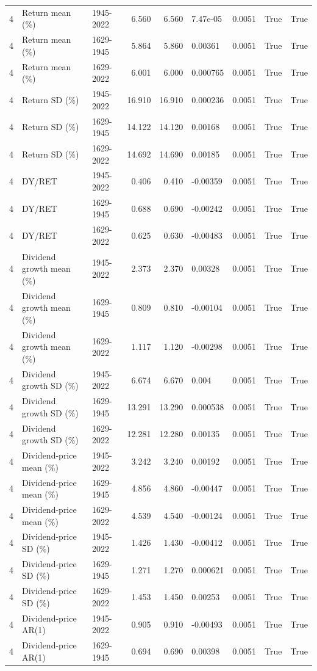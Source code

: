 \documentclass[10pt]{article}
\begin{document}
\begin{landscape}
\begin{longtable}{rllrrllrr}
4 & Return mean (\%) & 1945-2022 & 6.560 & 6.560 & 7.47e-05 & 0.0051 & True & True \\
4 & Return mean (\%) & 1629-1945 & 5.864 & 5.860 & 0.00361 & 0.0051 & True & True \\
4 & Return mean (\%) & 1629-2022 & 6.001 & 6.000 & 0.000765 & 0.0051 & True & True \\
4 & Return SD (\%) & 1945-2022 & 16.910 & 16.910 & 0.000236 & 0.0051 & True & True \\
4 & Return SD (\%) & 1629-1945 & 14.122 & 14.120 & 0.00168 & 0.0051 & True & True \\
4 & Return SD (\%) & 1629-2022 & 14.692 & 14.690 & 0.00185 & 0.0051 & True & True \\
4 & DY/RET & 1945-2022 & 0.406 & 0.410 & -0.00359 & 0.0051 & True & True \\
4 & DY/RET & 1629-1945 & 0.688 & 0.690 & -0.00242 & 0.0051 & True & True \\
4 & DY/RET & 1629-2022 & 0.625 & 0.630 & -0.00483 & 0.0051 & True & True \\
4 & Dividend growth mean (\%) & 1945-2022 & 2.373 & 2.370 & 0.00328 & 0.0051 & True & True \\
4 & Dividend growth mean (\%) & 1629-1945 & 0.809 & 0.810 & -0.00104 & 0.0051 & True & True \\
4 & Dividend growth mean (\%) & 1629-2022 & 1.117 & 1.120 & -0.00298 & 0.0051 & True & True \\
4 & Dividend growth SD (\%) & 1945-2022 & 6.674 & 6.670 & 0.004 & 0.0051 & True & True \\
4 & Dividend growth SD (\%) & 1629-1945 & 13.291 & 13.290 & 0.000538 & 0.0051 & True & True \\
4 & Dividend growth SD (\%) & 1629-2022 & 12.281 & 12.280 & 0.00135 & 0.0051 & True & True \\
4 & Dividend-price mean (\%) & 1945-2022 & 3.242 & 3.240 & 0.00192 & 0.0051 & True & True \\
4 & Dividend-price mean (\%) & 1629-1945 & 4.856 & 4.860 & -0.00447 & 0.0051 & True & True \\
4 & Dividend-price mean (\%) & 1629-2022 & 4.539 & 4.540 & -0.00124 & 0.0051 & True & True \\
4 & Dividend-price SD (\%) & 1945-2022 & 1.426 & 1.430 & -0.00412 & 0.0051 & True & True \\
4 & Dividend-price SD (\%) & 1629-1945 & 1.271 & 1.270 & 0.000621 & 0.0051 & True & True \\
4 & Dividend-price SD (\%) & 1629-2022 & 1.453 & 1.450 & 0.00253 & 0.0051 & True & True \\
4 & Dividend-price AR(1) & 1945-2022 & 0.905 & 0.910 & -0.00493 & 0.0051 & True & True \\
4 & Dividend-price AR(1) & 1629-1945 & 0.694 & 0.690 & 0.00398 & 0.0051 & True & True \\
\end{longtable}


\end{landscape}
\end{document}
